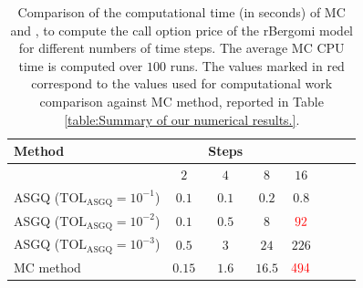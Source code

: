 \FloatBarrier
\begin{table}[h!]
	\centering
	\begin{tabular}{l*{6}{c}r}
	\toprule[1.5pt]
	Method & & Steps  & &     \\
	\hline	
         & $2$ & $4$ & $8$ & $16$ &   \\
		\hline
		ASGQ ($\text{TOL}_{\text{ASGQ}}=10^{-1}$)  & $0.1$ & $0.1$ & $0.2$ & $0.8$ \\
		ASGQ ($\text{TOL}_{\text{ASGQ}}=10^{-2}$)  & $0.1$ & $0.5$ & $8$ & $\red{92}$ \\
		ASGQ ($\text{TOL}_{\text{ASGQ}}=10^{-3}$)  & $0.5$ & $3$ & $24$ & $226$ \\
%		
		\hline
		MC method   & $ 0.15
		
		$  & $  1.6$  & $  16.5$ & $ \red{494}
		$  \\	
%		
		
		\bottomrule[1.25pt]
	\end{tabular}
	\caption{Comparison of the computational time (in seconds) of  MC and , to compute the call option price of the rBergomi model for different numbers of time steps. The average  MC CPU time is computed over $100$ runs. The values marked in red correspond to the values used for computational work comparison against MC method, reported in Table \ref{table:Summary of our numerical results.}. }
	\label{Comparsion of the computational time of  MC and MISC, used to compute Call option price of rBergomi model for different number of time steps. Case set3}
\end{table}
%



